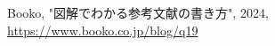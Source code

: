 \newpage
\begin{thebibliography}{9}
 Booko, "図解でわかる参考文献の書き方", 2024, \url{https://www.booko.co.jp/blog/q19}
\end{thebibliography}

